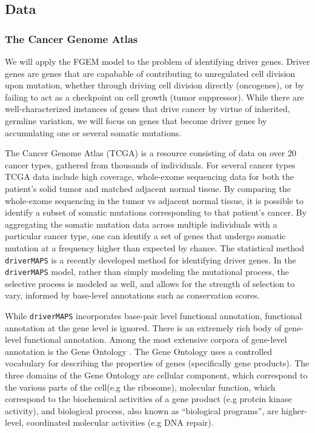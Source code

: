 \subsection{Data}

\subsubsection{The Cancer Genome Atlas}\label{sec:org31ff9f1}

We will apply the FGEM model to the problem of identifying driver genes.  Driver genes are genes that are capabable of contributing to unregulated cell division upon mutation, whether through driving cell division directly (oncogenes), or by failing to act as a checkpoint on cell growth (tumor suppressor).  While there are well-characterized instances of genes that drive cancer by virtue of inherited, germline variation, we will focus on genes that become driver genes
by accumulating one or several somatic mutations.

The Cancer Genome Atlas (TCGA) is a resource consisting of data on over 20 cancer types, gathered from thousands of individuals.  For several cancer types TCGA data include high coverage, whole-exome sequencing data for both the patient's solid tumor and matched adjacent normal tissue.  By comparing the whole-exome sequencing in the tumor vs adjacent normal tissue, it is possible to identify a subset of somatic mutations corresponding to that patient's cancer.  By aggregating the somatic mutation data across multiple individuals with a particular cancer type, one can identify a set of genes that undergo somatic mutation at a frequency higher than expected by chance.  The statistical method \texttt{driverMAPS} is a recently developed method for identifying driver genes. In the \texttt{driverMAPS} model, rather than simply modeling the mutational process, the selective process is modeled as well, and allows for the strength of selection to vary, informed by base-level annotations such as conservation scores.

While \texttt{driverMAPS} incorporates base-pair level functional annotation, functional annotation at the gene level is ignored.  There is an extremely rich body of gene-level functional annotation.  Among the most extensive corpora of gene-level annotation is the Gene Ontology \cite{GO}.  The Gene Ontology uses a controlled vocabulary for describing the properties of genes (specifically gene products).  The three domains of the Gene Ontology are cellular component, which correspond to the various parts of the cell(e.g the ribosome), molecular function, which correspond to the biochemical activities of a gene product (e.g protein kinase activity), and biological process, also known as ``biological programs'', are higher-level, coordinated molecular activities (e.g DNA repair).


